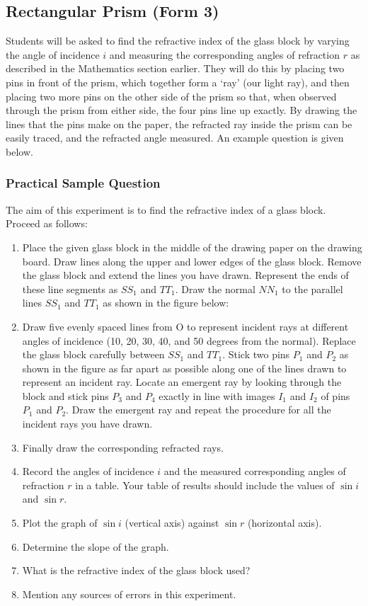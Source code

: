 \subsection{Rectangular Prism (Form 3)}

Students will be asked to find the refractive index of the glass block by varying
the angle of incidence $i$ and measuring the corresponding angles of refraction $r$ as
described in the Mathematics section earlier. They will do this by placing two pins in
front of the prism, which together form a `ray' (our light ray), and then placing two more
pins on the other side of the prism so that, when observed through the prism from either
side, the four pins line up exactly. By drawing the lines that the pins make on the paper,
the refracted ray inside the prism can be easily traced, and the refracted angle measured.
An example question is given below.

\subsubsection{Practical Sample Question}

The aim of this experiment is to find the refractive index of a glass block. Proceed
as follows:
\begin{enumerate}
\item{Place the given glass block in the middle of the drawing paper on the drawing
board. Draw lines along the upper and lower edges of the glass block. Remove the
glass block and extend the lines you have drawn. Represent the ends of these line
segments as $SS_1$ and $TT_1$. Draw the normal $NN_1$ to the parallel lines $SS_1$ and
$TT_1$ as shown in the figure below:
}%

\item{Draw five evenly spaced lines from O to represent incident rays at different
angles of incidence (10, 20, 30, 40, and 50 degrees from the normal). Replace the
glass block carefully between $SS_1$ and $TT_1$. Stick two pins $P_1$ and $P_2$ as shown in
the figure as far apart as possible along one of the lines drawn to represent an
incident ray. Locate an emergent ray by looking through the block and stick pins
$P_3$ and $P_4$ exactly in line with images $I_1$ and $I_2$ of pins $P_1$ and $P_2$. Draw the
emergent ray and repeat the procedure for all the incident rays you have drawn.}
\item{Finally draw the corresponding refracted rays.}


\item{Record the angles of incidence $i$ and the measured corresponding angles of
refraction $r$ in a table. Your table of results should include the values of
$\sin{i}$ and $\sin{r}$.}
\item{Plot the graph of $\sin{i}$ (vertical axis) against $\sin{r}$ (horizontal axis).}
\item{Determine the slope of the graph.}
\item{What is the refractive index of the glass block used?}
\item{Mention any sources of errors in this experiment.}
\end{enumerate}

